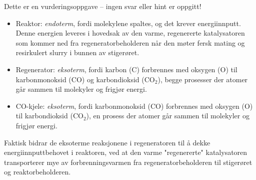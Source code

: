 \eject






Dette er en vurderingsoppgave -- ingen svar eller hint er oppgitt!







\begin{itemize}
\item{} Reaktor: {\it endoterm}, fordi molekylene spaltes, og det krever energiinnputt. Denne energien leveres i hovedsak av den varme, regenererte katalysatoren som kommer ned fra regeneratorbeholderen når den møter fersk mating og resirkulert slurry i bunnen av stigerøret.
\vskip 10pt
\item{} Regenerator: {\it eksoterm}, fordi karbon (C) forbrennes med oksygen (O) til karbonmonoksid (CO) og karbondioksid (CO$_{2}$), begge prosesser der atomer går sammen til molekyler og frigjør energi.
\vskip 10pt
\item{} CO-kjele: {\it eksoterm}, fordi karbonmonoksid (CO) forbrennes med oksygen (O) til karbondioksid (CO$_{2}$), en prosess der atomer går sammen til molekyler og frigjør energi.
\end{itemize}

Faktisk bidrar de eksoterme reaksjonene i regeneratoren til å dekke energiinnputtbehovet i reaktoren, ved at den varme "regenererte" katalysatoren transporterer mye av forbrenningsvarmen fra regeneratorbeholderen til stigerøret og reaktorbeholderen.


